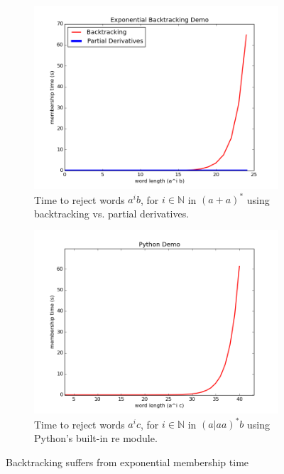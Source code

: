\begin{figure}[H]
  \centering
  \begin{subfigure}[b]{0.45\linewidth}
    \includegraphics[width=\linewidth]{fig/backtrack_fado}
    \caption{Time to reject words $a^ib$, for $i\in\mathbb{N}$ in $(a+a)^*$ using backtracking vs. partial derivatives.}
  \end{subfigure}
  \hspace{1cm}
  \begin{subfigure}[b]{0.45\linewidth}
    \includegraphics[width=\linewidth]{fig/backtrack_python}
    \caption{Time to reject words $a^ic$, for $i\in\mathbb{N}$ in $(a|aa)^*b$ using Python's built-in re module.}
  \end{subfigure}
  
  \caption{Backtracking suffers from exponential membership time}
  \label{fig:backtrack_demo}
\end{figure}

